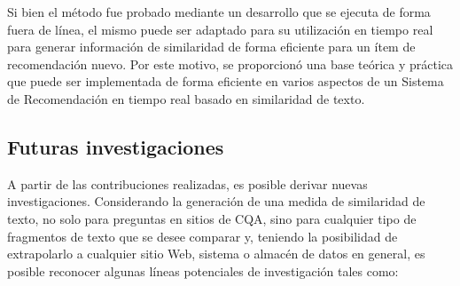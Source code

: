 \bigskip Si bien el método fue probado mediante un desarrollo que se ejecuta de forma fuera de línea, el mismo puede ser adaptado para su utilización en tiempo real para generar información de similaridad de forma eficiente para un ítem de recomendación nuevo. Por este motivo, se proporcionó una base teórica y práctica que puede ser implementada de forma eficiente en varios aspectos de un Sistema de Recomendación en tiempo real basado en similaridad de texto.


\subsection{Futuras investigaciones}
A partir de las contribuciones realizadas, es posible derivar nuevas investigaciones. Considerando la generación de una medida de similaridad de texto, no solo para preguntas en sitios de CQA, sino para cualquier tipo de fragmentos de texto que se desee comparar y, teniendo la posibilidad de extrapolarlo a cualquier sitio Web, sistema o almacén de datos en general, es posible reconocer algunas líneas potenciales de investigación tales como:
